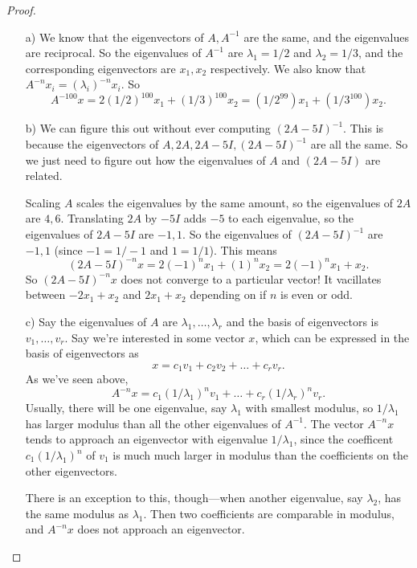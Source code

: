 \documentclass{article}
\theoremstyle{definition}
\begin{document}
\begin{proof}
	\begin{itemize}
		\item[a)] We know that the eigenvectors of $A, A^{-1}$ are the same, and the eigenvalues are reciprocal. So the eigenvalues of $A^{-1}$ are $\lambda_1=1/2$ and $\lambda_2=1/3$, and the corresponding eigenvectors are $x_1, x_2$ respectively. We also know that $A^{-n}x_i= (\lambda_i)^{-n} x_i$. So 
		\[A^{-100}x= 2 (1/2)^{100} x_1 + (1/3)^{100} x_2= (1/2^{99}) x_1 + (1/3^{100}) x_2.\]
		\item[b)] We can figure this out without ever computing $(2A-5I)^{-1}$. This is because the eigenvectors of $A, 2A, 2A-5I, (2A-5I)^{-1}$ are all the same. So we just need to figure out how the eigenvalues of $A$ and $(2A-5I)$ are related. 
		
		Scaling $A$ scales the eigenvalues by the same amount, so the eigenvalues of $2A$ are $4, 6$. Translating $2A$ by $-5I$ adds $-5$ to each eigenvalue, so the eigenvalues of $2A-5I$ are $-1, 1$. So the eigenvalues of $(2A-5I)^{-1}$ are $-1, 1$ (since $-1=1/-1$ and $1=1/1$). This means 
		\[(2A-5I)^{-n}x = 2 (-1)^{n} x_1 + (1)^n x_2=2(-1)^{n} x_1 + x_2.\]
		So $(2A-5I)^{-n}x$ does not converge to a particular vector! It vacillates between $-2x_1 + x_2$ and $2x_1 + x_2$ depending on if $n$ is even or odd.
		\item[c)] Say the eigenvalues of $A$ are $\lambda_1, \dots, \lambda_r$ and the basis of eigenvectors is $v_1, \dots, v_r$. Say we're interested in some vector $x$, which can be expressed in the basis of eigenvectors as
		\[x=c_1 v_1 + c_2 v_2 + \dots + c_r v_r .\]
	As we've seen above,
	\[A^{-n}x= c_1 (1/\lambda_1)^{n} v_1 + \dots + c_r (1/\lambda_r)^{n} v_r . \]
	Usually, there will be one eigenvalue, say $\lambda_1$ with smallest modulus, so $1/\lambda_1$ has larger modulus than all the other eigenvalues of $A^{-1}$. The vector $A^{-n}x$ tends to approach an eigenvector with eigenvalue $1/\lambda_1$, since the coefficent $c_1 (1/\lambda_1)^{n}$ of $v_1$ is much much larger in modulus than the coefficients on the other eigenvectors. 
	
	There is an exception to this, though---when another eigenvalue, say $\lambda_2$, has the same modulus as $\lambda_1$. Then two coefficients are comparable in modulus, and $A^{-n}x$ does not approach an eigenvector.
		
		
		
	\end{itemize}
\end{proof}
\end{document}

